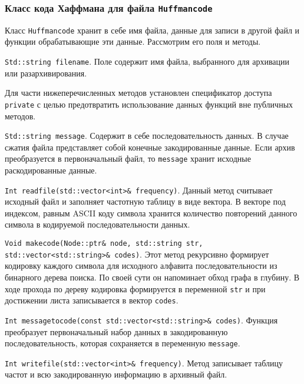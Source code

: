 \subsubsection{Класс кода Хаффмана для файла \texttt{Huffman{\textunderscore}code}}


Класс \texttt{Huffman{\textunderscore}code} хранит в себе имя файла, данные для записи в другой файл и функции обрабатывающие эти данные.
Рассмотрим его поля и методы.



\texttt{Std::string filename}.
Поле содержит имя файла, выбранного для архивации или разархивирования.



Для части нижеперечисленных методов установлен спецификатор доступа \texttt{private} с целью предотвратить использование данных функций вне публичных методов.

 

\texttt{Std::string message}.
Содержит в себе последовательность данных.
В случае сжатия файла представляет собой конечные закодированные данные.
Если архив преобразуется в первоначальный файл, то \texttt{message} хранит исходные раскодированные данные.



\texttt{Int read{\textunderscore}file(std::vector<int>\& frequency)}.
Данный метод считывает исходный файл и заполняет частотную таблицу в виде вектора.
В векторе под индексом, равным ASCII коду символа хранится количество повторений данного символа в кодируемой последовательности данных.



\texttt{Void make{\textunderscore}code(Node::ptr\& node, std::string str, std::vector<std::string>\& codes)}.
Этот метод рекурсивно формирует кодировку каждого символа для исходного алфавита последовательности из бинарного дерева поиска.
По своей сути он напоминает обход графа в глубину.
В ходе прохода по дереву кодировка формируется в переменной \texttt{str} и при достижении листа записывается в вектор \texttt{codes}.



\texttt{Int message{\textunderscore}to{\textunderscore}code(const std::vector<std::string>\& codes)}.
Функция преобразует первоначальный набор данных в закодированную последовательность, которая сохраняется в переменную \texttt{message}.



\texttt{Int write{\textunderscore}file(std::vector<int>\& frequency)}.
Метод записывает таблицу частот и всю закодированную информацию в архивный файл.




